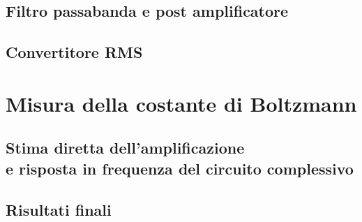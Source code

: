 \documentclass[a4paper,10pt]{article}
\begin{document}
\subsection{Filtro passabanda e post amplificatore}

\subsection{Convertitore RMS}

\section{Misura della costante di Boltzmann} 

\subsection{Stima diretta dell'amplificazione \\e risposta in frequenza del circuito complessivo}

\subsection{Risultati finali}
\end{document}
